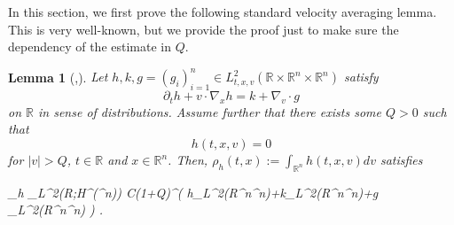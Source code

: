 \documentclass[11pt]{amsart}
\newtheorem{lemma}[theorem]{Lemma}
\theoremstyle{definition}
\theoremstyle{remark}
\numberwithin{equation}{section}
\newcommand{\nb}{\nabla}
\newcommand{\0}{\emptyset}
\newcommand{\bbR}{\mathbb R}
\begin{document}
	
	
	In this section, we first prove the following standard velocity averaging lemma. This is very well-known, but we provide the proof just to make sure the dependency of the estimate in $Q$.
	
	\begin{lemma}[{{\cite{Ago,GLPS},\cite[Theorem 7.2.1]{Glassey96}}}] 
		\label{averaging}
		Let $h, k, g = ( g_{i} )_{i=1}^{n} \in L^2_{t, x, v}(\bbR \times\mathbb{R}^n\times\mathbb{R}^n)$  satisfy
		$$\partial_t h + v\cdot \nabla_x h= k + \nb_v\cdot g $$ on $\bbR$ in sense of distributions. Assume further that there exists some $Q>0$ such that $$h(t, x, v)=0$$ for $\vert v\vert>Q$, $t\in \mathbb{R}$ and $x\in \mathbb{R}^n$. Then, $\rho_{h}(t, x):=\int_{\bbR^{n}} h(t, x, v)dv$ satisfies
		\begin{flalign}
			\Vert\rho_{h} \Vert_{L^2(\bbR;H^(^n))} \leq C(1+Q)^{}\left( \Vert h\Vert_{L^2(\bbR\times{}^n\times{}^n)}+\Vert k\Vert_{L^2(\bbR\times{}^n\times{}^n)}+\Vert g \Vert_{L^2(\bbR\times{}^n\times{}^n)} \right) . 
		\end{flalign}
	\end{lemma}
\end{document}
